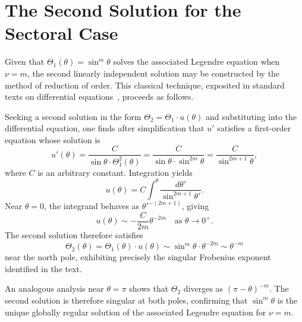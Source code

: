 \documentclass[
  aip,
  amsmath,amssymb,
  preprint
]{revtex4-1}
\begin{document}
\section{The Second Solution for the Sectoral Case}
\label{app:second_solution}
Given that $\Theta_1(\theta) = \sin^m\theta$ solves the associated Legendre equation when $\nu = m$, the second linearly independent solution may be constructed by the method of reduction of order. This classical technique, exposited in standard texts on differential equations~\cite{CoddingtonLevinson1955, Arfken2012}, proceeds as follows.

Seeking a second solution in the form $\Theta_2 = \Theta_1 \cdot u(\theta)$ and substituting into the differential equation, one finds after simplification that $u'$ satisfies a first-order equation whose solution is
\begin{equation}
u'(\theta) = \frac{C}{\sin\theta \cdot \Theta_1^2(\theta)} = \frac{C}{\sin\theta \cdot \sin^{2m}\theta} = \frac{C}{\sin^{2m+1}\theta},
\label{eq:u_prime}
\end{equation}
where $C$ is an arbitrary constant. Integration yields
\begin{equation}
u(\theta) = C\int^\theta \frac{d\theta'}{\sin^{2m+1}\theta'}.
\label{eq:u_integral}
\end{equation}
Near $\theta = 0$, the integrand behaves as $\theta'^{-(2m+1)}$, giving
\begin{equation}
u(\theta) \sim -\frac{C}{2m}\theta^{-2m} \quad \text{as } \theta \to 0^+.
\label{eq:u_near_0}
\end{equation}
The second solution therefore satisfies
\begin{equation}
\Theta_2(\theta) = \Theta_1(\theta) \cdot u(\theta) \sim \sin^m\theta \cdot \theta^{-2m} \sim \theta^{-m}
\label{eq:Theta2_behavior}
\end{equation}
near the north pole, exhibiting precisely the singular Frobenius exponent identified in the text.

An analogous analysis near $\theta = \pi$ shows that $\Theta_2$ diverges as $(\pi-\theta)^{-m}$. The second solution is therefore singular at both poles, confirming that $\sin^m\theta$ is the unique globally regular solution of the associated Legendre equation for $\nu = m$.
\end{document}
